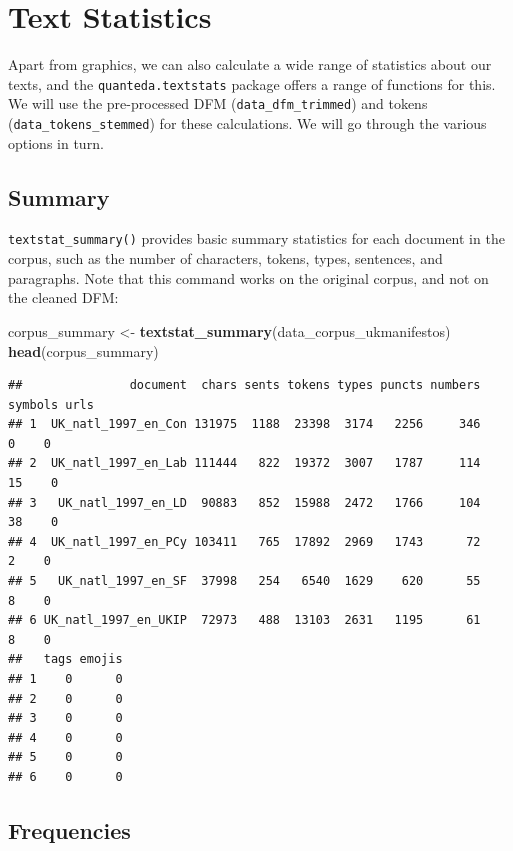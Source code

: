 \documentclass[
]{book}
\newenvironment{Shaded}{\begin{snugshade}}{\end{snugshade}}
\newcommand{\FunctionTok}[1]{\textcolor[rgb]{0.13,0.29,0.53}{\textbf{#1}}}
\newcommand{\NormalTok}[1]{#1}
\newcommand{\OtherTok}[1]{\textcolor[rgb]{0.56,0.35,0.01}{#1}}
\begin{document}
\section{Text Statistics}\label{text-statistics}

Apart from graphics, we can also calculate a wide range of statistics about our texts, and the \texttt{quanteda.textstats} package offers a range of functions for this. We will use the pre-processed DFM (\texttt{data\_dfm\_trimmed}) and tokens (\texttt{data\_tokens\_stemmed}) for these calculations. We will go through the various options in turn.

\subsection{Summary}\label{summary}

\texttt{textstat\_summary()} provides basic summary statistics for each document in the corpus, such as the number of characters, tokens, types, sentences, and paragraphs. Note that this command works on the original corpus, and not on the cleaned DFM:

\begin{Shaded}
\begin{Highlighting}[]
\NormalTok{corpus\_summary }\OtherTok{\textless{}{-}} \FunctionTok{textstat\_summary}\NormalTok{(data\_corpus\_ukmanifestos)}
\FunctionTok{head}\NormalTok{(corpus\_summary)}
\end{Highlighting}
\end{Shaded}

\begin{verbatim}
##               document  chars sents tokens types puncts numbers symbols urls
## 1  UK_natl_1997_en_Con 131975  1188  23398  3174   2256     346       0    0
## 2  UK_natl_1997_en_Lab 111444   822  19372  3007   1787     114      15    0
## 3   UK_natl_1997_en_LD  90883   852  15988  2472   1766     104      38    0
## 4  UK_natl_1997_en_PCy 103411   765  17892  2969   1743      72       2    0
## 5   UK_natl_1997_en_SF  37998   254   6540  1629    620      55       8    0
## 6 UK_natl_1997_en_UKIP  72973   488  13103  2631   1195      61       8    0
##   tags emojis
## 1    0      0
## 2    0      0
## 3    0      0
## 4    0      0
## 5    0      0
## 6    0      0
\end{verbatim}

\subsection{Frequencies}\label{frequencies}
\end{document}
